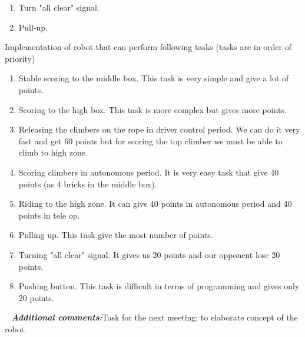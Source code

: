 \begin{enumerate*}
\begin{enumerate}
\begin{enumerate}
	  		\item Turn "all clear" signal.
	  		\item Pull-up.
  		\end{enumerate}
  	\end{enumerate}
  	\item Implementation of robot that can perform following tasks (tasks are in order of priority)
  	\begin{enumerate}
  		\item Stable scoring to the middle box. This task is very simple and give a lot of points.
  		\item Scoring to the high box. This task is more complex but gives more points.
  		\item Releasing the climbers on the rope in driver control period. We can do it very fast and get 60 points but for scoring the top climber we must be able to climb to high zone.
  		\item Scoring climbers in autonomous period. It is very easy task that give 40 points (as 4 bricks in the middle box).
  		\item Riding to the high zone. It can give 40 points in autonomous period and 40 points in tele op.
  		\item Pulling up. This task give the most number of points.
  		\item Turning "all clear" signal. It gives us 20 points and our opponent lose 20 points.
  		\item Pushing button. This task is difficult in terms of programming and gives only 20 points.
  	\end{enumerate}
	
	 \newline
	\textit{\textbf{Additional comments:}}Task for the next meeting: to elaborate concept of the robot.
  	
  \end{enumerate*}
  

  


\fillpage
